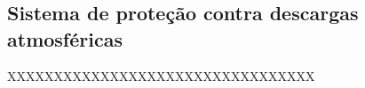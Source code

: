 \subsection{Sistema de proteção contra descargas atmosféricas} \label{section: lightning}

XXXXXXXXXXXXXXXXXXXXXXXXXXXXXXXXX

%

%

%
\newpage

